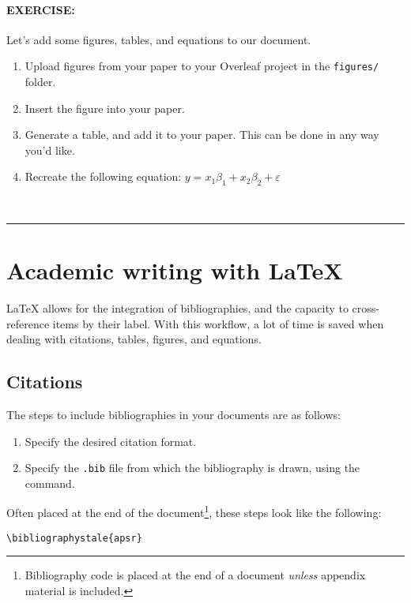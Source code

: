 \documentclass[11pt]{article}
\begin{document}
\paragraph{EXERCISE:} Let's add some figures, tables, and equations to our document.
\begin{enumerate}[noitemsep]
    \item Upload figures from your paper to your Overleaf project in the \verb|figures/| folder.
    \item Insert the figure into your paper.
    \item Generate a table, and add it to your paper. This can be done in any way you'd like.
    \item Recreate the following equation: $y = x_1\beta_1 + x_2\beta_2 + \varepsilon$
\end{enumerate}\\\vspace{0.7em}
\hrule


\section*{Academic writing with {\LaTeX}}

{\LaTeX} allows for the integration of bibliographies, and the capacity to cross-reference items by their label. With this workflow, a lot of time is saved when dealing with citations, tables, figures, and equations.

\subsection*{Citations}

The steps to include bibliographies in your documents are as follows:

\begin{enumerate}
    \item Specify the desired citation format.
    \item Specify the \texttt{.bib} file from which the bibliography is drawn, using the \verb|| command.
\end{enumerate}

\noindent Often placed at the end of the document\footnote{Bibliography code is placed at the end of a document \textit{unless} appendix material is included.}, these steps look like the following:

\begin{lstlisting}
\bibliographystale{apsr}

\end{lstlisting}
\end{document}

